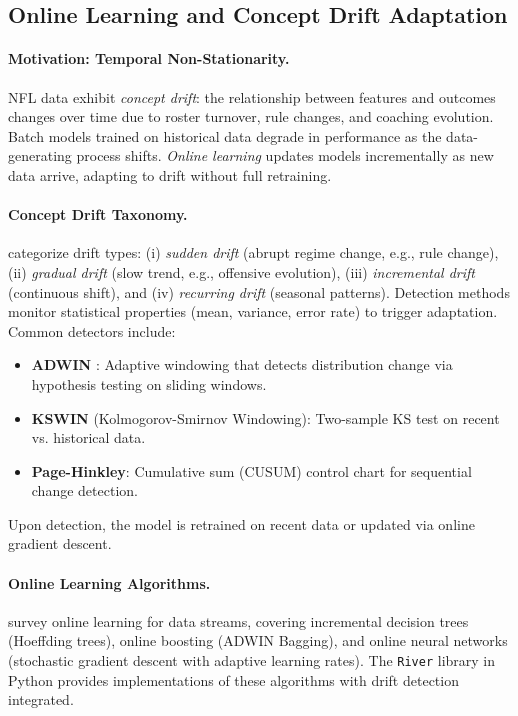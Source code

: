 \subsection{Online Learning and Concept Drift Adaptation}
\label{subsec:online-lit}

\paragraph{Motivation: Temporal Non-Stationarity.}
NFL data exhibit \emph{concept drift}: the relationship between features and outcomes changes over time due to roster turnover, rule changes, and coaching evolution. Batch models trained on historical data degrade in performance as the data-generating process shifts. \emph{Online learning} updates models incrementally as new data arrive, adapting to drift without full retraining.

\paragraph{Concept Drift Taxonomy.}
\citet{gama2014survey} categorize drift types: (i) \emph{sudden drift} (abrupt regime change, e.g., rule change), (ii) \emph{gradual drift} (slow trend, e.g., offensive evolution), (iii) \emph{incremental drift} (continuous shift), and (iv) \emph{recurring drift} (seasonal patterns). Detection methods monitor statistical properties (mean, variance, error rate) to trigger adaptation. Common detectors include:
\begin{itemize}
  \item \textbf{ADWIN} \citep{bifet2007adwin}: Adaptive windowing that detects distribution change via hypothesis testing on sliding windows.
  \item \textbf{KSWIN} (Kolmogorov-Smirnov Windowing): Two-sample KS test on recent vs. historical data.
  \item \textbf{Page-Hinkley}: Cumulative sum (CUSUM) control chart for sequential change detection.
\end{itemize}
Upon detection, the model is retrained on recent data or updated via online gradient descent.

\paragraph{Online Learning Algorithms.}
\citet{bifet2018} survey online learning for data streams, covering incremental decision trees (Hoeffding trees), online boosting (ADWIN Bagging), and online neural networks (stochastic gradient descent with adaptive learning rates). The \texttt{River} library \citep{montiel2021river} in Python provides implementations of these algorithms with drift detection integrated.

